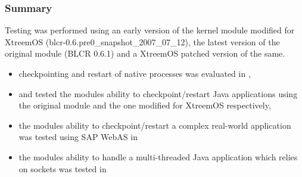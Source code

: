 





\subsubsection{Summary}
Testing was performed using an early version of the kernel module modified for XtreemOS (blcr-0.6.pre0\_snapshot\_2007\_07\_12), the latest version of the original module (BLCR 0.6.1) and a XtreemOS patched version of the same.

\begin{itemize}
\item checkpointing and restart of native processes was evaluated in ,
\item {} and  tested the modules ability to checkpoint/restart Java applications using the original module and the one modified for XtreemOS respectively,
\item the modules ability to checkpoint/restart a complex real-world application was tested using SAP WebAS in 
\item the modules ability to handle a multi-threaded Java application which relies on sockets was tested in 
\end{itemize}

